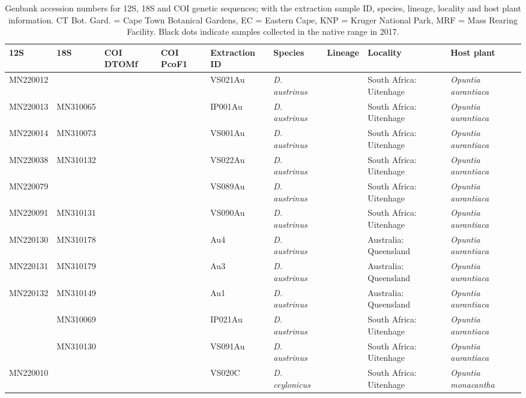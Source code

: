\begin{landscape}
{\scriptsize %
\renewcommand{\arraystretch}{0.5}
\begin{longtable}{@{}lllllp{2.7cm}p{2.2cm}p{5cm}p{4cm}@{}}
\caption{Genbank accession numbers for 12S, 18S and COI genetic sequences; with the extraction sample ID, species, lineage, locality and host plant information. CT Bot. Gard. = Cape Town Botanical Gardens, EC = Eastern Cape, KNP = Kruger National Park, MRF = Mass Rearing Facility. Black dots indicate samples collected in the native range in 2017.} \label{appendix:sequenceInfo} \\
\toprule
\textbf{12S} & \textbf{18S} & \textbf{COI DTOMf} & \textbf{COI PcoF1} & \textbf{Extraction ID} & \textbf{Species} & \textbf{Lineage} & \textbf{Locality} & \textbf{Host plant} \\ \midrule
MN220012 &  &  &  & VS021Au & \textit{D. austrinus} &  & South Africa: Uitenhage & \textit{Opuntia aurantiaca} \\
MN220013 & MN310065 &  &  & IP001Au & \textit{D. austrinus} &  & South Africa: Uitenhage & \textit{Opuntia aurantiaca} \\
MN220014 & MN310073 &  &  & VS001Au & \textit{D. austrinus} &  & South Africa: Uitenhage & \textit{Opuntia aurantiaca} \\
MN220038 & MN310132 &  &  & VS022Au & \textit{D. austrinus} &  & South Africa: Uitenhage & \textit{Opuntia aurantiaca} \\
MN220079 &  &  &  & VS089Au & \textit{D. austrinus} &  & South Africa: Uitenhage & \textit{Opuntia aurantiaca} \\
MN220091 & MN310131 &  &  & VS090Au & \textit{D. austrinus} &  & South Africa: Uitenhage & \textit{Opuntia aurantiaca} \\
MN220130 & MN310178 &  &  & Au4 & \textit{D. austrinus} &  & Australia: Queensland & \textit{Opuntia aurantiaca} \\
MN220131 & MN310179 &  &  & Au3 & \textit{D. austrinus} &  & Australia: Queensland & \textit{Opuntia aurantiaca} \\
MN220132 & MN310149 &  &  & Au1 & \textit{D. austrinus} &  & Australia: Queensland & \textit{Opuntia aurantiaca} \\
 & MN310069 &  &  & IP021Au & \textit{D. austrinus} &  & South Africa: Uitenhage & \textit{Opuntia aurantiaca} \\
 & MN310130 &  &  & VS091Au & \textit{D. austrinus} &  & South Africa: Uitenhage & \textit{Opuntia aurantiaca} \\
MN220010 &  &  &  & VS020C & \textit{D. ceylonicus} &  & South Africa: Uitenhage & \textit{Opuntia monacantha} \\

\end{longtable}}
\end{landscape}
